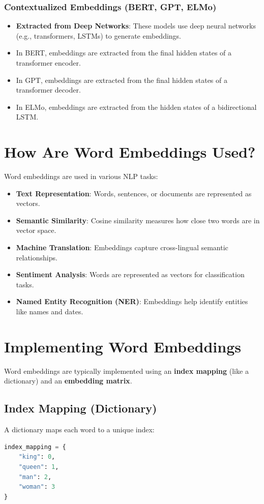 \begin{notechapter}
\subsubsection{Contextualized Embeddings (BERT, GPT, ELMo)}
\begin{itemize}
    \item \textbf{Extracted from Deep Networks}: These models use 
    deep neural networks (e.g., transformers, LSTMs) to generate 
    embeddings.
    \item In BERT, embeddings are extracted from the final hidden 
    states of a transformer encoder.
    \item In GPT, embeddings are extracted from the final hidden 
    states of a transformer decoder.
    \item In ELMo, embeddings are extracted from the hidden 
    states of a bidirectional LSTM.
\end{itemize}

\section{How Are Word Embeddings Used?}
Word embeddings are used in various NLP tasks:
\begin{itemize}
    \item \textbf{Text Representation}: Words, sentences, or 
    documents are represented as vectors.
    \item \textbf{Semantic Similarity}: Cosine similarity measures 
    how close two words are in vector space.
    \item \textbf{Machine Translation}: Embeddings capture 
    cross-lingual semantic relationships.
    \item \textbf{Sentiment Analysis}: Words are represented as 
    vectors for classification tasks.
    \item \textbf{Named Entity Recognition (NER)}: Embeddings help 
    identify entities like names and dates.
\end{itemize}

\section{Implementing Word Embeddings}
Word embeddings are typically implemented using an \textbf{index 
mapping} (like a dictionary) and an \textbf{embedding matrix}.

\subsection{Index Mapping (Dictionary)}
A dictionary maps each word to a unique index:
\begin{lstlisting}[language=Python]
index_mapping = {
    "king": 0,
    "queen": 1,
    "man": 2,
    "woman": 3
}
\end{lstlisting}


\end{notechapter}
